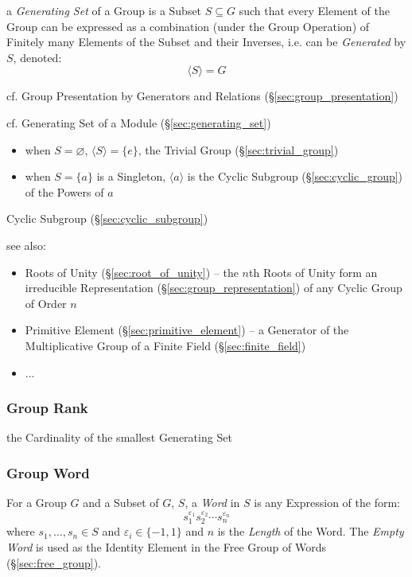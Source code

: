 a \emph{Generating Set} of a Group is a Subset $S \subseteq G$ such that every
Element of the Group can be expressed as a combination (under the Group
Operation) of Finitely many Elements of the Subset and their Inverses, i.e. can
be \emph{Generated} by $S$, denoted:
\[
  \langle{S}\rangle = G
\]

\fist cf. Group Presentation by Generators and Relations
(\S\ref{sec:group_presentation})

cf. Generating Set of a Module (\S\ref{sec:generating_set})

\begin{itemize}
  \item when $S = \varnothing$, $\langle{S}\rangle = \{ e \}$, the Trivial Group
    (\S\ref{sec:trivial_group})
  \item when $S = \{ a \}$ is a Singleton, $\langle{a}\rangle$ is the Cyclic
    Subgroup (\S\ref{sec:cyclic_group}) of the Powers of $a$
\end{itemize}

Cyclic Subgroup (\S\ref{sec:cyclic_subgroup})

see also:
\begin{itemize}
  \item Roots of Unity (\S\ref{sec:root_of_unity}) -- the $n$th Roots of Unity
    form an irreducible Representation (\S\ref{sec:group_representation}) of any
    Cyclic Group of Order $n$
  \item Primitive Element (\S\ref{sec:primitive_element}) -- a Generator of the
    Multiplicative Group of a Finite Field (\S\ref{sec:finite_field})
  \item ...
\end{itemize}



\subsubsection{Group Rank}\label{sec:group_rank}

the Cardinality of the smallest Generating Set



\subsubsection{Group Word}\label{sec:group_word}

For a Group $G$ and a Subset of $G$, $S$, a \emph{Word} in $S$ is any Expression
of the form:
\[
    s_1^{\varepsilon_1}s_2^{\varepsilon_2} \cdots s_n^{\varepsilon_n}
\]
where $s_1,\ldots,s_n \in S$ and $\varepsilon_i \in \{-1, 1\}$ and $n$ is the
\emph{Length} of the Word. The \emph{Empty Word} is used as the Identity Element
in the Free Group of Words (\S\ref{sec:free_group}).



